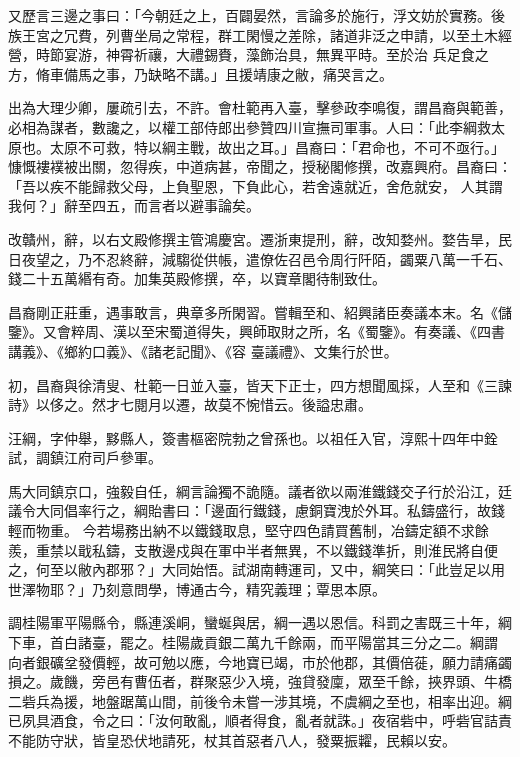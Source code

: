 \begin{pinyinscope}
 又歷言三邊之事曰：「今朝廷之上，百闢晏然，言論多於施行，浮文妨於實務。後族王宮之冗費，列曹坐局之常程，群工閑慢之差除，諸道非泛之申請，以至土木經營，時節宴游，神霄祈禳，大禮錫賚，藻飾治具，無異平時。至於治
 兵足食之方，脩車備馬之事，乃缺略不講。」且援靖康之敝，痛哭言之。



 出為大理少卿，屢疏引去，不許。會杜範再入臺，擊參政李鳴復，謂昌裔與範善，必相為謀者，數讒之，以權工部侍郎出參贊四川宣撫司軍事。人曰：「此李綱救太原也。太原不可救，特以綱主戰，故出之耳。」昌裔曰：「君命也，不可不亟行。」慷慨褸襆被出關，忽得疾，中道病甚，帝聞之，授秘閣修撰，改嘉興府。昌裔曰：「吾以疾不能歸救父母，上負聖恩，下負此心，若舍遠就近，舍危就安，
 人其謂我何？」辭至四五，而言者以避事論矣。



 改贛州，辭，以右文殿修撰主管鴻慶宮。遷浙東提刑，辭，改知婺州。婺告旱，民日夜望之，乃不忍終辭，減騶從供帳，遣僚佐召邑令周行阡陌，蠲粟八萬一千石、錢二十五萬緡有奇。加集英殿修撰，卒，以寶章閣待制致仕。



 昌裔剛正莊重，遇事敢言，典章多所閑習。嘗輯至和、紹興諸臣奏議本末。名《儲鑒》。又會粹周、漢以至宋蜀道得失，興師取財之所，名《蜀鑒》。有奏議、《四書講義》、《鄉約口義》、《諸老記聞》、《容
 臺議禮》、文集行於世。



 初，昌裔與徐清叟、杜範一日並入臺，皆天下正士，四方想聞風採，人至和《三諫詩》以侈之。然才七閱月以遷，故莫不惋惜云。後謚忠肅。



 汪綱，字仲舉，黟縣人，簽書樞密院勃之曾孫也。以祖任入官，淳熙十四年中銓試，調鎮江府司戶參軍。



 馬大同鎮京口，強毅自任，綱言論獨不詭隨。議者欲以兩淮鐵錢交子行於沿江，廷議令大同倡率行之，綱貽書曰：「邊面行鐵錢，慮銅寶洩於外耳。私鑄盛行，故錢輕而物重。
 今若場務出納不以鐵錢取息，堅守四色請買舊制，冶鑄定額不求餘羨，重禁以戢私鑄，支散邊戍與在軍中半者無異，不以鐵錢準折，則淮民將自便之，何至以敝內郡邪？」大同始悟。試湖南轉運司，又中，綱笑曰：「此豈足以用世澤物耶？」乃刻意問學，博通古今，精究義理；覃思本原。



 調桂陽軍平陽縣令，縣連溪峒，蠻蜒與居，綱一遇以恩信。科罰之害既三十年，綱下車，首白諸臺，罷之。桂陽歲貢銀二萬九千餘兩，而平陽當其三分之二。綱謂
 向者銀礦坌發價輕，故可勉以應，今地寶已竭，市於他郡，其價倍蓰，願力請痛蠲損之。歲饑，旁邑有曹伍者，群聚惡少入境，強貸發廩，眾至千餘，挾界頭、牛橋二砦兵為援，地盤踞萬山間，前後令未嘗一涉其境，不虞綱之至也，相率出迎。綱已夙具酒食，令之曰：「汝何敢亂，順者得食，亂者就誅。」夜宿砦中，呼砦官詰責不能防守狀，皆皇恐伏地請死，杖其首惡者八人，發粟振糶，民賴以安。




\end{pinyinscope}
